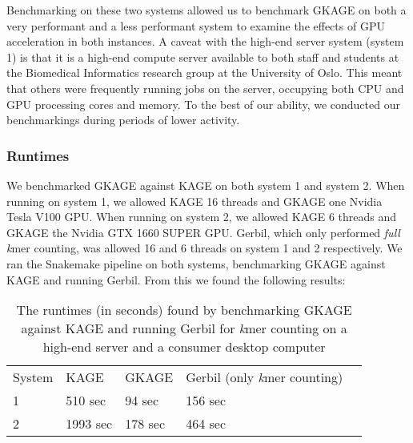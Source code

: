 Benchmarking on these two systems allowed us to benchmark GKAGE on both a very performant and a less performant system to examine the effects of GPU acceleration in both instances.
A caveat with the high-end server system (system 1) is that it is a high-end compute server available to both staff and students at the Biomedical Informatics research group at the University of Oslo.
This meant that others were frequently running jobs on the server, occupying both CPU and GPU processing cores and memory.
To the best of our ability, we conducted our benchmarkings during periods of lower activity.

\subsubsection{Runtimes} \label{results:benchmarking:runtimes}
We benchmarked GKAGE against KAGE on both system 1 and system 2.
When running on system 1, we allowed KAGE 16 threads and GKAGE one Nvidia Tesla V100 GPU.
When running on system 2, we allowed KAGE 6 threads and GKAGE the Nvidia GTX 1660 SUPER GPU.
Gerbil, which only performed \textit{full} \textit{k}mer counting, was allowed 16 and 6 threads on system 1 and 2 respectively.
We ran the Snakemake pipeline on both systems, benchmarking GKAGE against KAGE and running Gerbil.
From this we found the following results:

\begin{table}[H]
\begin{center}
\begin{tabular}{lllll}
  \multicolumn{1}{l|}{System} & \multicolumn{1}{l}{KAGE}     & \multicolumn{1}{l}{GKAGE} & \multicolumn{1}{l}{Gerbil (only \textit{k}mer counting)} & \\ \cline{1-4}
\multicolumn{1}{l|}{1}      & \multicolumn{1}{l}{510 sec}  & \multicolumn{1}{l}{94 sec} & \multicolumn{1}{l}{156 sec} & \\
\multicolumn{1}{l|}{2}      & \multicolumn{1}{l}{1993 sec} & \multicolumn{1}{l}{178 sec} & \multicolumn{1}{l}{464 sec} & \\
\end{tabular}
\end{center}
\caption{
  The runtimes (in seconds) found by benchmarking GKAGE against KAGE and running Gerbil for \textit{k}mer counting on a high-end server and a consumer desktop computer
}
\label{results:benchmarking:tables:runtimes}
\end{table}

 

